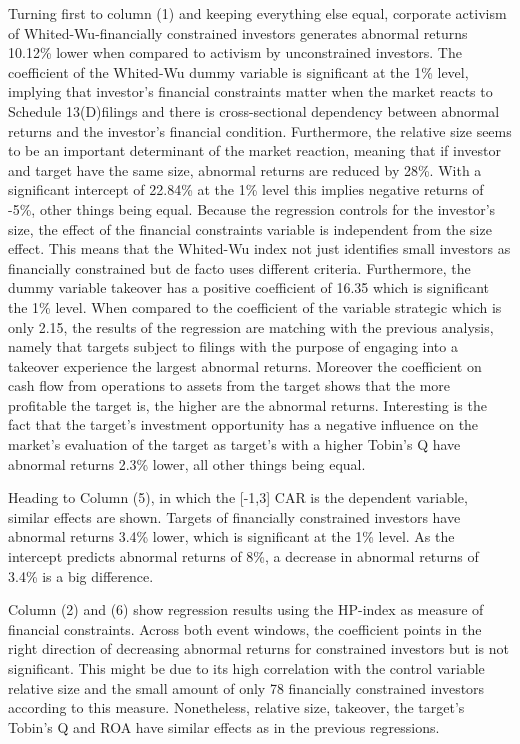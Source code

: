 \documentclass[12pt]{article}
\begin{document}
Turning first to column (1) and keeping everything else equal, corporate activism of Whited-Wu-financially constrained investors generates abnormal returns 10.12\% lower when compared to activism by unconstrained investors. The coefficient of the Whited-Wu dummy variable is significant at the 1\% level, implying that investor's financial constraints matter when the market reacts to Schedule 13(D)filings and there is cross-sectional dependency between abnormal returns and the investor's financial condition. Furthermore, the relative size seems to be an important determinant of the market reaction, meaning that if investor and target have the same size, abnormal returns are reduced by 28\%. With a significant intercept of 22.84\% at the 1\% level this implies negative returns of -5\%, other things being equal. Because the regression controls for the investor's size, the effect of the financial constraints variable is independent from the size effect. This means that the Whited-Wu index not just identifies small investors as financially constrained but de facto uses different criteria. Furthermore, the dummy variable takeover has a positive coefficient of 16.35 which is significant the 1\% level. When compared to the coefficient of the variable strategic which is only 2.15, the results of the regression are matching with the previous analysis, namely that targets subject to filings with the purpose of engaging into a takeover experience the largest abnormal returns. Moreover the coefficient on cash flow from operations to assets from the target shows that the more profitable the target is, the higher are the abnormal returns. Interesting is the fact that the target's investment opportunity has a negative influence on the market's evaluation of the target as target's with a higher Tobin's Q have abnormal returns 2.3\% lower, all other things being equal.

Heading to Column (5), in which the [-1,3] CAR is the dependent variable, similar effects are shown. Targets of financially constrained investors have abnormal returns 3.4\% lower, which is significant at the 1\% level. As the intercept predicts abnormal returns of 8\%, a decrease in abnormal returns of 3.4\% is a big difference.

Column (2) and (6) show regression results using the HP-index as measure of financial constraints. Across both event windows, the coefficient points in the right direction of decreasing abnormal returns for constrained investors but is not significant. This might be due to its high correlation with the control variable relative size and the small amount of only 78 financially constrained investors according to this measure. Nonetheless, relative size, takeover, the target's Tobin's Q and ROA have similar effects as in the previous regressions.
\end{document}
